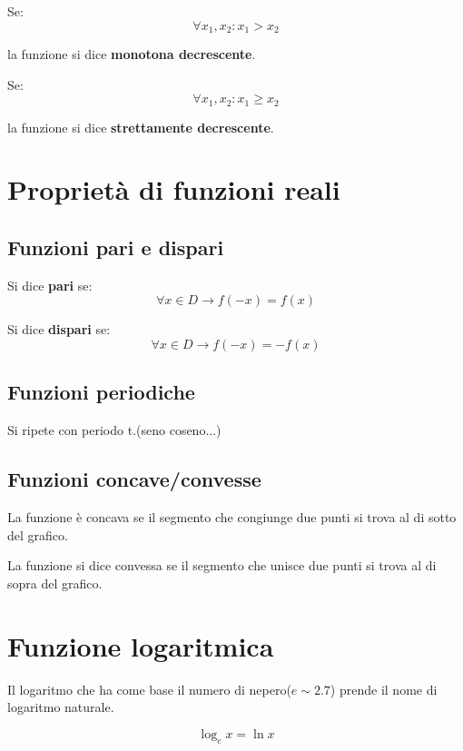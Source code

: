 Se: 
\begin{equation*}
    \forall x_1,x_2 : x_1 > x_2
\end{equation*}

la funzione si dice \textbf{monotona decrescente}.

Se: 
\begin{equation*}
    \forall x_1,x_2 : x_1 \geq x_2
\end{equation*}

la funzione si dice \textbf{strettamente decrescente}.


\section{Proprietà di funzioni reali}
\subsection{Funzioni pari e dispari}

Si dice \textbf{pari} se:
\begin{equation*}
    \forall x \in D \rightarrow f(-x) = f(x)
\end{equation*}

Si dice \textbf{dispari} se:
\begin{equation*}
    \forall x \in D \rightarrow f(-x) = -f(x)
\end{equation*}

\subsection{Funzioni periodiche}
Si ripete con periodo t.(seno coseno...)

\subsection{Funzioni concave/convesse}
La funzione è concava se il segmento che congiunge due punti si trova al di sotto del grafico.

La funzione si dice convessa se il segmento che unisce due punti si trova al di sopra del grafico.

\section{Funzione logaritmica}


Il logaritmo che ha come base il numero di nepero($e \sim 2.7$) prende il nome di logaritmo naturale.


\begin{equation*}
    \log_e x = \ln x
\end{equation*}

